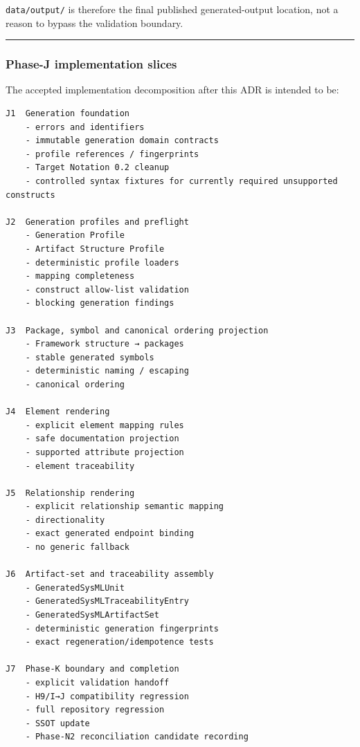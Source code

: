 \texttt{data/output/} is therefore the final published generated-output location, not a reason to bypass the validation boundary.

\begin{center}\rule{0.5\linewidth}{0.5pt}\end{center}

\hypertarget{phase-j-implementation-slices}{%
\subsubsection{Phase-J implementation slices}\label{phase-j-implementation-slices}}

The accepted implementation decomposition after this ADR is intended to be:

\begin{verbatim}
J1  Generation foundation
    - errors and identifiers
    - immutable generation domain contracts
    - profile references / fingerprints
    - Target Notation 0.2 cleanup
    - controlled syntax fixtures for currently required unsupported constructs

J2  Generation profiles and preflight
    - Generation Profile
    - Artifact Structure Profile
    - deterministic profile loaders
    - mapping completeness
    - construct allow-list validation
    - blocking generation findings

J3  Package, symbol and canonical ordering projection
    - Framework structure → packages
    - stable generated symbols
    - deterministic naming / escaping
    - canonical ordering

J4  Element rendering
    - explicit element mapping rules
    - safe documentation projection
    - supported attribute projection
    - element traceability

J5  Relationship rendering
    - explicit relationship semantic mapping
    - directionality
    - exact generated endpoint binding
    - no generic fallback

J6  Artifact-set and traceability assembly
    - GeneratedSysMLUnit
    - GeneratedSysMLTraceabilityEntry
    - GeneratedSysMLArtifactSet
    - deterministic generation fingerprints
    - exact regeneration/idempotence tests

J7  Phase-K boundary and completion
    - explicit validation handoff
    - H9/I→J compatibility regression
    - full repository regression
    - SSOT update
    - Phase-N2 reconciliation candidate recording
\end{verbatim}


